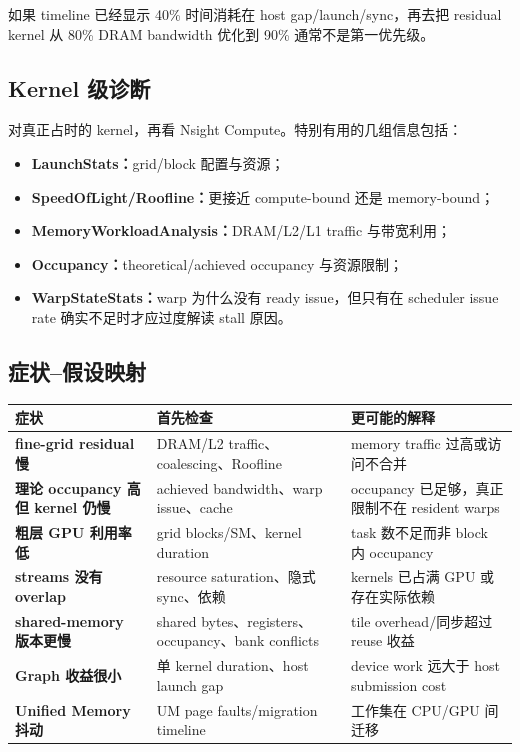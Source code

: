 如果 timeline 已经显示 40\% 时间消耗在 host gap/launch/sync，再去把 residual kernel 从 80\% DRAM bandwidth 优化到 90\% 通常不是第一优先级。

\subsection{Kernel 级诊断}

对真正占时的 kernel，再看 Nsight Compute。特别有用的几组信息包括\cite{nsightCompute2026}：
\begin{itemize}[nosep,leftmargin=*]
\item \textbf{LaunchStats：}grid/block 配置与资源；
\item \textbf{SpeedOfLight/Roofline：}更接近 compute-bound 还是 memory-bound；
\item \textbf{MemoryWorkloadAnalysis：}DRAM/L2/L1 traffic 与带宽利用；
\item \textbf{Occupancy：}theoretical/achieved occupancy 与资源限制；
\item \textbf{WarpStateStats：}warp 为什么没有 ready issue，但只有在 scheduler issue rate 确实不足时才应过度解读 stall 原因。
\end{itemize}

\subsection{症状--假设映射}

\begin{center}
\small
\begin{tabularx}{0.98\textwidth}{>{\raggedright\arraybackslash\bfseries}p{3.2cm}>{\raggedright\arraybackslash}p{3.8cm}>{\raggedright\arraybackslash}X}
\toprule
症状 & 首先检查 & 更可能的解释\\
\midrule
fine-grid residual 慢 & DRAM/L2 traffic、coalescing、Roofline & memory traffic 过高或访问不合并\\
理论 occupancy 高但 kernel 仍慢 & achieved bandwidth、warp issue、cache & occupancy 已足够，真正限制不在 resident warps\\
粗层 GPU 利用率低 & grid blocks/SM、kernel duration & task 数不足而非 block 内 occupancy\\
streams 没有 overlap & resource saturation、隐式 sync、依赖 & kernels 已占满 GPU 或存在实际依赖\\
shared-memory 版本更慢 & shared bytes、registers、occupancy、bank conflicts & tile overhead/同步超过 reuse 收益\\
Graph 收益很小 & 单 kernel duration、host launch gap & device work 远大于 host submission cost\\
Unified Memory 抖动 & UM page faults/migration timeline & 工作集在 CPU/GPU 间迁移\\
\bottomrule
\end{tabularx}
\end{center}


